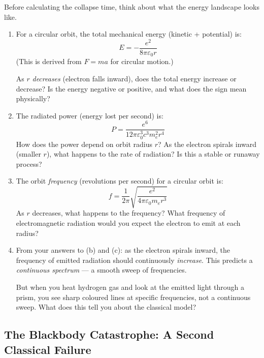 \documentclass[12pt, a4paper]{book}
\begin{document}
\begin{puzzlebox}
Before calculating the collapse time, think about what
the energy landscape looks like.

\begin{enumerate}[label=(\alph*), leftmargin=*]
  \item For a circular orbit, the total mechanical energy
        (kinetic + potential) is:
        \[
          E = -\frac{e^2}{8\pi\varepsilon_0 r}
        \]
        (This is derived from $F = ma$ for circular motion.)

        As $r$ \emph{decreases} (electron falls inward),
        does the total energy increase or decrease?
        Is the energy negative or positive, and what does
        the sign mean physically?

  \item The radiated power (energy lost per second) is:
        \[
          P = \frac{e^6}{12\pi\varepsilon_0^3 c^3 m_e^2 r^4}
        \]
        How does the power depend on orbit radius $r$?
        As the electron spirals inward (smaller $r$),
        what happens to the rate of radiation?
        Is this a stable or runaway process?

  \item The orbit \emph{frequency} (revolutions per second)
        for a circular orbit is:
        \[
          f = \frac{1}{2\pi}\sqrt{\frac{e^2}{4\pi\varepsilon_0 m_e r^3}}
        \]
        As $r$ decreases, what happens to the frequency?
        What frequency of electromagnetic radiation would
        you expect the electron to emit at each radius?

  \item From your answers to (b) and (c):
        as the electron spirals inward, the frequency of
        emitted radiation should continuously \emph{increase}.
        This predicts a \emph{continuous spectrum} ---
        a smooth sweep of frequencies.

        But when you heat hydrogen gas and look at the
        emitted light through a prism, you see sharp
        coloured lines at specific frequencies,
        not a continuous sweep.
        What does this tell you about the classical model?
\end{enumerate}
\end{puzzlebox}

\subsection{The Blackbody Catastrophe: A Second Classical Failure}
\end{document}
